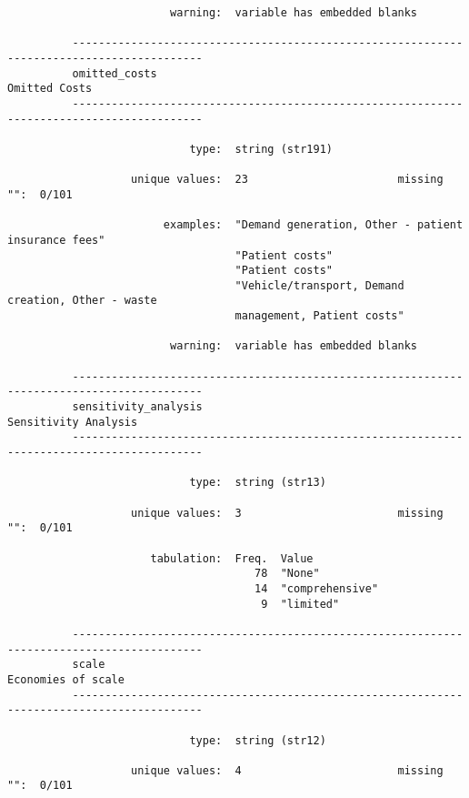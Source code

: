 \documentclass{article}
\begin{document}
\begin{verbatim}
                         warning:  variable has embedded blanks
          
          ------------------------------------------------------------------------------------------
          omitted_costs                                                                Omitted Costs
          ------------------------------------------------------------------------------------------
          
                            type:  string (str191)
          
                   unique values:  23                       missing "":  0/101
          
                        examples:  "Demand generation, Other - patient insurance fees"
                                   "Patient costs"
                                   "Patient costs"
                                   "Vehicle/transport, Demand creation, Other - waste
                                   management, Patient costs"
          
                         warning:  variable has embedded blanks
          
          ------------------------------------------------------------------------------------------
          sensitivity_analysis                                                  Sensitivity Analysis
          ------------------------------------------------------------------------------------------
          
                            type:  string (str13)
          
                   unique values:  3                        missing "":  0/101
          
                      tabulation:  Freq.  Value
                                      78  "None"
                                      14  "comprehensive"
                                       9  "limited"
          
          ------------------------------------------------------------------------------------------
          scale                                                                   Economies of scale
          ------------------------------------------------------------------------------------------
          
                            type:  string (str12)
          
                   unique values:  4                        missing "":  0/101
          

\end{verbatim}
\end{document}
